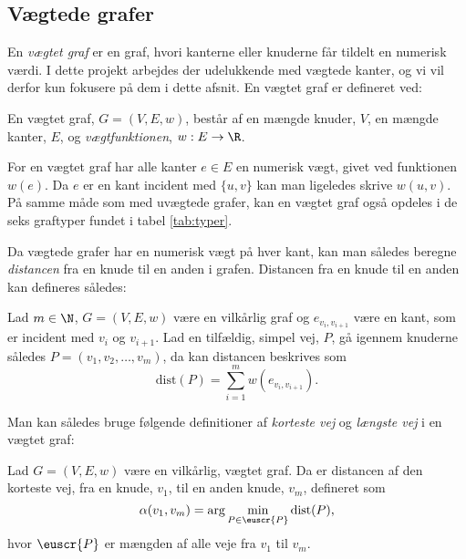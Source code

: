 \subsection{Vægtede grafer} \label{kap:vaegtede}
En \emph{vægtet graf} er en graf, hvori kanterne eller knuderne får tildelt en numerisk værdi. I dette projekt arbejdes der udelukkende med vægtede kanter, og vi vil derfor kun fokusere på dem i dette afsnit.
En vægtet graf er defineret ved:
\begin{defn}
En vægtet graf, $G=(V,E,w)$, består af en mængde knuder, $V$, en mængde kanter, $E$, og \emph{vægtfunktionen}, $w: E \rightarrow \R$.
\end{defn}

For en vægtet graf har alle kanter $e\in E$ en numerisk vægt, givet ved funktionen $w (e)$. Da $e$ er en kant incident med $\{u,v\}$ kan man ligeledes skrive $w (u,v)$. På samme måde som med uvægtede grafer, kan en vægtet graf også opdeles i de seks graftyper fundet i tabel \ref{tab:typer}.


Da vægtede grafer har en numerisk vægt på hver kant, kan man således beregne \emph{distancen} fra en knude til en anden i grafen. Distancen fra en knude til en anden kan defineres således:

\begin{defn}[Distance]
Lad $m\in \N $, $G=(V,E,w)$ være en vilkårlig graf og  $e_{v_i,v_{i+1}}$ være en kant, som er incident med $v_i$ og $v_{i+1}$. Lad en tilfældig, simpel vej, $P$, gå igennem knuderne således $P=(v_{1},v_{2},\dotsc,v_{m})$, da kan distancen beskrives som
	\begin{equation*}
	\mathrm{dist}(P)=\sum_{i=1}^{m}w(e_{v_i,v_{i+1}}).
	\end{equation*}  
\end{defn}

Man kan således bruge følgende definitioner af \emph{korteste vej} og \emph{længste vej} i en vægtet graf:


\begin{defn} \label{defn:min.vej}
Lad $G=(V,E,w)$ være en vilkårlig, vægtet graf. Da er distancen af den korteste vej, fra en knude, $v_1$, til en anden knude, $v_m$, defineret som
	\begin{equation*}
		\alpha(v_1,v_m)=\arg \min_{P \in \euscr{P}}
		\textrm{dist}(P),
	\end{equation*}
	hvor $\euscr{P}$ er mængden af alle veje fra $v_1$ til $v_m$.
\end{defn}

